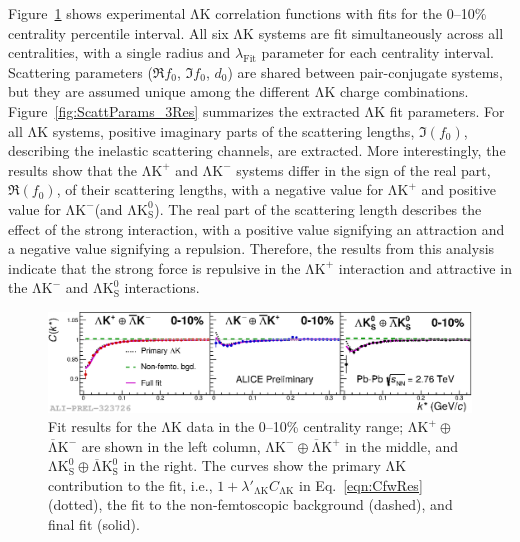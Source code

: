 \documentclass{svproc}
\newcommand{\LamK}{$\mathrm{\Lambda}\mathrm{K}$\xspace}
\newcommand{\LamKchP}{$\mathrm{\Lambda}\mathrm{K^{+}}$\xspace}
\newcommand{\ALamKchM}{$\overline{\mathrm{\Lambda}}\mathrm{K^{-}}$\xspace}
\newcommand{\LamKchM}{$\mathrm{\Lambda}\mathrm{K^{-}}$\xspace}
\newcommand{\ALamKchP}{$\overline{\mathrm{\Lambda}}\mathrm{K^{+}}$\xspace}
\newcommand{\LamKs}{$\mathrm{\Lambda}\mathrm{K^{0}_{S}}$\xspace}
\newcommand{\ALamKs}{$\overline{\mathrm{\Lambda}}\mathrm{K^{0}_{S}}$\xspace}
\begin{document}
Figure~\ref{fig:LamKFits_3Res} shows experimental \LamK correlation functions with fits for the 0--10\% centrality percentile interval.
All six \LamK systems are fit simultaneously across all centralities, with a single radius and $\lambda_{\mathrm{Fit}}$ parameter for each centrality interval.
Scattering parameters ($\Re f_{0}$, $\Im f_{0}$, $d_{0}$) are shared between pair-conjugate systems, but they are assumed unique among the different \LamK charge combinations. 
Figure~\ref{fig:ScattParams_3Res} summarizes the extracted \LamK fit parameters.
For all \LamK systems, positive imaginary parts of the scattering lengths, $\Im(f_{0})$, describing the inelastic scattering channels, are extracted. 
More interestingly, the results show that the \LamKchP and \LamKchM systems differ in the sign of the real part, $\Re(f_{0})$, of their scattering lengths, with a negative value for \LamKchP and positive value for \LamKchM (and \LamKs).
The real part of the scattering length describes the effect of the strong interaction, with a positive value signifying an attraction and a negative value signifying a repulsion.
Therefore, the results from this analysis indicate that the strong force is repulsive in the \LamKchP interaction and attractive in the \LamKchM and \LamKs interactions.
\begin{figure}[h!]
  \centering
  \includegraphics[width=\textwidth]{./2019-06-11-canKStarCfwFits_CombineConj_0010_LabelLines.eps}
  \caption[\LamK data with fits]
  {
  Fit results for the \LamK data in the 0--10\% centrality range; $\mathrm{\Lambda}\mathrm{K^{+}}\oplus$\ALamKchM are shown in the left column, $\mathrm{\Lambda}\mathrm{K^{-}}\oplus$\ALamKchP in the middle, and $\mathrm{\Lambda}\mathrm{K^{0}_{S}}\oplus$\ALamKs in the right. 
  The curves show the primary \LamK contribution to the fit, i.e., $1 + \lambda'_{\mathrm{\Lambda}\mathrm{K}}C_{\mathrm{\Lambda}\mathrm{K}}$ in Eq.~\ref{eqn:CfwRes} (dotted), the fit to the non-femtoscopic background (dashed), and final fit (solid).
 }
  \label{fig:LamKFits_3Res}
\end{figure}
\end{document}
